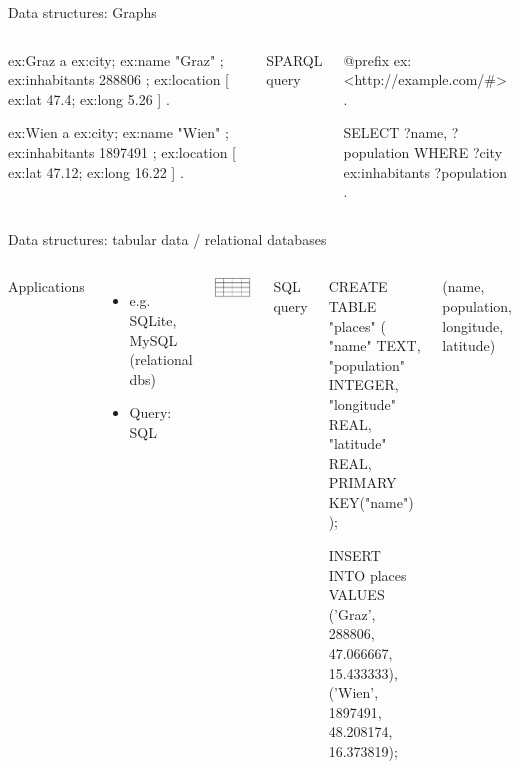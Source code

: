 \begin{frame}[fragile]{Data structures: Graphs}
\begin{columns}[T,onlytextwidth]
\begin{turtlecode}
ex:Graz a ex:city;  
ex:name "Graz" ; 
ex:inhabitants 288806 ; 
ex:location [ ex:lat 47.4; ex:long 5.26 ] .

ex:Wien a ex:city;  
ex:name "Wien" ; 
ex:inhabitants 1897491 ; 
ex:location [ ex:lat 47.12; ex:long 16.22 ] .
\end{turtlecode}

SPARQL query
\begin{sparqlcode}
@prefix ex: <http://example.com/#> .

SELECT ?name, ?population
WHERE {
    ?city ex:inhabitants ?population .
}
\end{sparqlcode}

  \end{columns}
\end{frame}

\begin{frame}[fragile]{Data structures: tabular data / relational databases}
  \begin{columns}[T,onlytextwidth]
    Applications
      \begin{itemize}\footnotesize
          \item e.g. SQLite, MySQL (relational dbs) 
          \item Query: SQL 
      \end{itemize}
      \bigskip 
      
      \begin{block}{}
        \includegraphics[width=0.97\textwidth]{img/tabelle.png}
      \end{block}


SQL query
\begin{sqlcode}
CREATE TABLE "places" (
 "name" TEXT,
 "population" INTEGER,
 "longitude" REAL,
 "latitude" REAL,
 PRIMARY KEY("name")
);

INSERT INTO places 
VALUES 
('Graz', 288806, 47.066667, 15.433333), 
('Wien', 1897491, 48.208174, 16.373819);
\end{sqlcode}
\footnotesize
(name, population, longitude, latitude) 

  \end{columns}
\end{frame}


